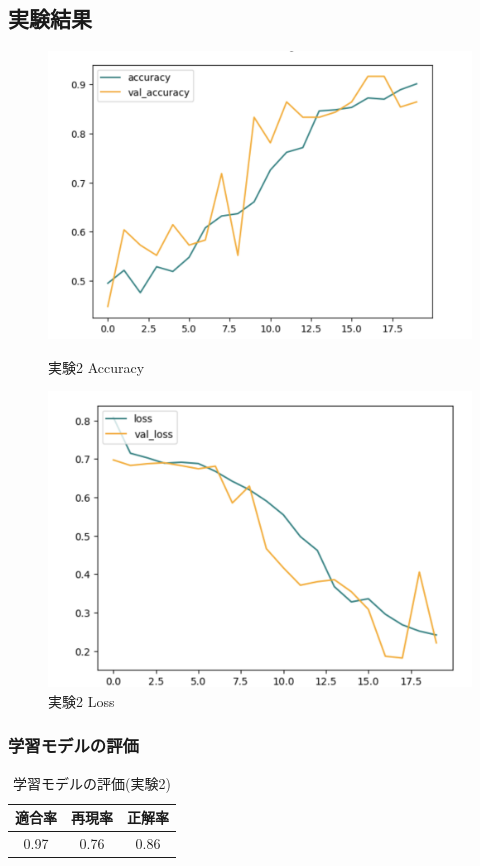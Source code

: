 \documentclass[a4paper, 11pt, titlepage]{jsarticle}
\begin{document}
\clearpage

\subsection{実験結果}
\begin{figure}[htbp]
  \begin{minipage}[b]{0.45\linewidth}
    \centering
    \includegraphics[keepaspectratio, scale=0.33]{ex2_acc.png}
    \caption{実験2 Accuracy}
  \end{minipage}
  \begin{minipage}[b]{0.45\linewidth}
    \centering
    \includegraphics[keepaspectratio, scale=0.33]{ex2_loss.png}
    \caption{実験2 Loss}
  \end{minipage}
\end{figure}

\subsubsection{学習モデルの評価}
\begin{table}[htb]
\centering
  \caption{学習モデルの評価(実験2)}
  \begin{tabular}{|c|c|c|}  \hline
    適合率 & 再現率 & 正解率 \\ \hline
    0.97 & 0.76 & 0.86 \\ \hline
  \end{tabular}
\end{table}
\end{document}
